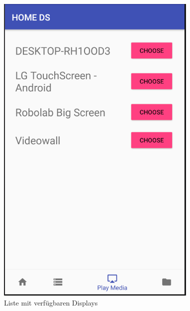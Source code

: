 \begin{figure}[H]
\centering
\includegraphics[scale=0.35]{images/06_AndroidApp/06_displayChoice}
\caption{Liste mit verfügbaren Displays}
\label{fig:dispNav}
\end{figure}

